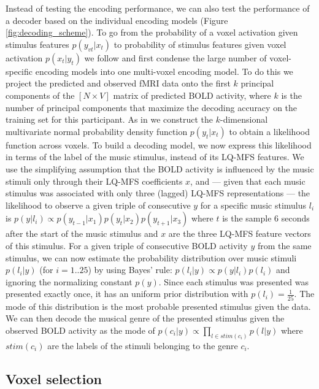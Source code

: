 Instead of testing the encoding performance, we can also test the performance of
a decoder based on the individual encoding models \citep{NG11}
(Figure \ref{fig:decoding_scheme}). To go from the probability of a voxel activation given stimulus features $p(y_{vt}|x_{t})$ to probability of stimulus features given voxel activation $p(x_{t}|y_{t})$ we follow \citet{NG09} and first condense
the large number of voxel-specific encoding models into one multi-voxel encoding model.
To do this we project the predicted and observed f{MRI} data onto the first $k$
principal components of the $[N\times V]$ matrix of predicted BOLD activity, where $k$ is the number of principal components that maximize the decoding
accuracy on the training set for this participant.
As in \citet{NG09} we construct the $k$-dimensional multivariate normal
probability density function $p(y_{t}|x_{t})$ to obtain a likelihood function across voxels.
To build a decoding model, we now express this likelihood in terms of the label
of the music stimulus, instead of its LQ-MFS features.
We use the simplifying assumption that the BOLD activity is influenced by the music stimuli only through their LQ-MFS
coefficients $x$, and --- given that each music stimulus was associated with only
three (lagged) LQ-MFS representations --- the likelihood to observe a given
triple of consecutive $y$ for a specific music stimulus $l_{i}$ is $p(y|l_{i}) \propto
p(y_{t-1}|x_{1})p(y_{t}|x_{2})p(y_{t+1}|x_{3})$ where $t$ is the sample 6
seconds after the start of the music stimulus and $x$ are the three LQ-MFS
feature vectors of this stimulus.
For a given triple of consecutive BOLD activity $y$ from the same stimulus, we can now estimate the probability distribution over music stimuli
$p(l_{i}|y)$ (for $i=1..25$) by using Bayes' rule: $p(l_{i}|y) \propto
p(y|l_{i})p(l_{i})$ and ignoring the normalizing constant $p(y)$. Since each
stimulus was presented was presented exactly once, it has an uniform prior
distribution with $p(l_{i})=\frac{1}{25}$. The mode of this distribution is the
most probable presented stimulus given the data.
We can then decode the musical genre of the presented stimulus given the observed BOLD activity as the mode of $p(c_{i}|y)
\propto \prod\nolimits_{l \in stim(c_{i})} p(l|y)$ where $stim(c_{i})$ are
the labels of the stimuli belonging to the genre $c_{i}$. 

\subsection*{Voxel selection}

